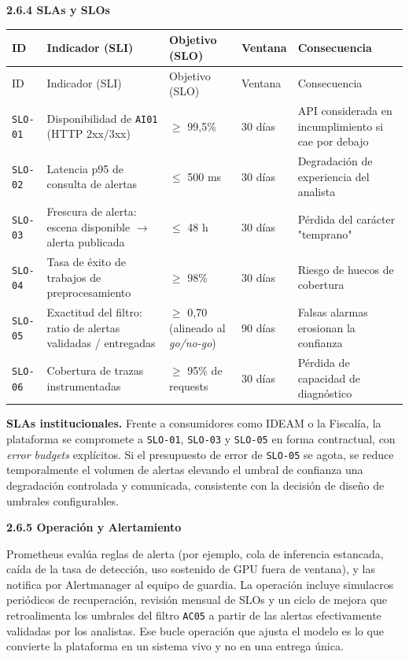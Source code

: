 \documentclass{article}
\newcommand{\mdhfour}[1]{\par\medskip\noindent\textbf{#1}\par\nobreak\smallskip}
\begin{document}
\mdhfour{2.6.4 SLAs y SLOs}

{\footnotesize
\begin{longtable}{@{}L{0.40in}L{2.27in}L{0.91in}L{0.47in}L{1.76in}@{}}
\toprule
ID & Indicador (SLI) & Objetivo (SLO) & Ventana & Consecuencia \\
\midrule
\endfirsthead
\toprule
ID & Indicador (SLI) & Objetivo (SLO) & Ventana & Consecuencia \\
\midrule
\endhead
\bottomrule
\endlastfoot
\texttt{SLO-\allowbreak{}01} & Disponibilidad de \texttt{AI01} (HTTP 2xx/3xx) & \ensuremath{\geq} 99,5\% & 30 días & API considerada en incumplimiento si cae por debajo \\
\texttt{SLO-\allowbreak{}02} & Latencia p95 de consulta de alertas & \ensuremath{\leq} 500 ms & 30 días & Degradación de experiencia del analista \\
\texttt{SLO-\allowbreak{}03} & Frescura de alerta: escena disponible \ensuremath{\rightarrow} alerta publicada & \ensuremath{\leq} 48 h & 30 días & Pérdida del carácter "temprano" \\
\texttt{SLO-\allowbreak{}04} & Tasa de éxito de trabajos de preprocesamiento & \ensuremath{\geq} 98\% & 30 días & Riesgo de huecos de cobertura \\
\texttt{SLO-\allowbreak{}05} & Exactitud del filtro: ratio de alertas validadas / entregadas & \ensuremath{\geq} 0,70 (alineado al \emph{go/no-go}) & 90 días & Falsas alarmas erosionan la confianza \\
\texttt{SLO-\allowbreak{}06} & Cobertura de trazas instrumentadas & \ensuremath{\geq} 95\% de requests & 30 días & Pérdida de capacidad de diagnóstico \\
\end{longtable}
}

\textbf{SLAs institucionales.} Frente a consumidores como IDEAM o la Fiscalía, la plataforma se compromete a \texttt{SLO-\allowbreak{}01}, \texttt{SLO-\allowbreak{}03} y \texttt{SLO-\allowbreak{}05} en forma contractual, con \emph{error budgets} explícitos. Si el presupuesto de error de \texttt{SLO-\allowbreak{}05} se agota, se reduce temporalmente el volumen de alertas elevando el umbral de confianza \textemdash{}una degradación controlada y comunicada, consistente con la decisión de diseño de umbrales configurables.

\mdhfour{2.6.5 Operación y Alertamiento}

Prometheus evalúa reglas de alerta (por ejemplo, cola de inferencia estancada, caída de la tasa de detección, uso sostenido de GPU fuera de ventana), y las notifica por Alertmanager al equipo de guardia. La operación incluye simulacros periódicos de recuperación, revisión mensual de SLOs y un ciclo de mejora que retroalimenta los umbrales del filtro \texttt{AC05} a partir de las alertas efectivamente validadas por los analistas. Ese bucle \textemdash{}operación que ajusta el modelo\textemdash{} es lo que convierte la plataforma en un sistema vivo y no en una entrega única.
\end{document}
